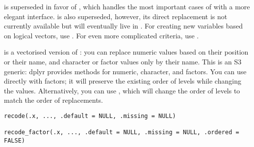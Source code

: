 \documentclass[a4paper]{book}
\begin{document}
%
\begin{Description}
\strong{[Superseded]}

 is superseded in favor of , which handles the most
important cases of  with a more elegant interface.
 is also superseded, however, its direct replacement is not
currently available but will eventually live in
. For creating new variables based
on logical vectors, use . For even more complicated criteria, use
.

 is a vectorised version of : you can replace numeric
values based on their position or their name, and character or factor values
only by their name. This is an S3 generic: dplyr provides methods for
numeric, character, and factors. You can use  directly with
factors; it will preserve the existing order of levels while changing the
values. Alternatively, you can use , which will change the
order of levels to match the order of replacements.
\end{Description}
%
\begin{Usage}
\begin{verbatim}
recode(.x, ..., .default = NULL, .missing = NULL)

recode_factor(.x, ..., .default = NULL, .missing = NULL, .ordered = FALSE)
\end{verbatim}
\end{Usage}
%
\end{document}

